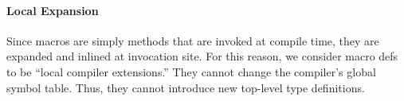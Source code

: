 \documentclass[preprint,nocopyrightspace]{sigplanconf}
\begin{document}
\paragraph{Local Expansion} Since macros are simply methods that are invoked
at compile time, they are expanded and inlined at invocation site.
For this reason, we consider macro defs to be ``local compiler extensions.''
They cannot change the compiler's global symbol table.
Thus, they cannot introduce new top-level type definitions.
















\end{document}
